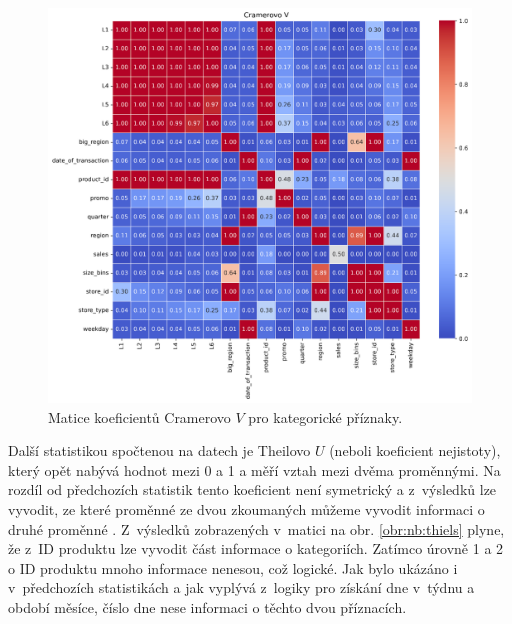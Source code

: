 \begin{figure}[h!]
    \centering
    \includegraphics[width=\textwidth]{obrazky/pripravadat/correlation_matrix_cramers-everything-SFF-stores_targets002.png}
    \caption{Matice koeficientů Cramerovo $V$ pro kategorické příznaky.}
    \label{obr:nb:cramers}
\end{figure}

Další statistikou spočtenou na datech je Theilovo $U$ (neboli koeficient nejistoty), který opět nabývá hodnot mezi 0 a 1 a měří vztah mezi dvěma proměnnými. Na rozdíl od předchozích statistik tento koeficient není symetrický a z~výsledků lze vyvodit, ze které proměnné ze dvou zkoumaných můžeme vyvodit informaci o druhé proměnné \cite{bib:correl}. Z~výsledků zobrazených v~matici na obr. \ref*{obr:nb:thiels} plyne, že z~ID produktu lze vyvodit část informace o kategoriích. Zatímco úrovně 1 a 2 o ID produktu mnoho informace nenesou, což logické. Jak bylo ukázáno i v~předchozích statistikách a jak vyplývá z~logiky pro získání dne v~týdnu a období měsíce, číslo dne nese informaci o těchto dvou příznacích.

